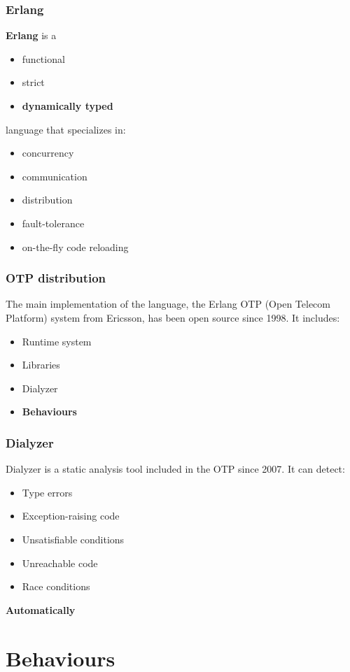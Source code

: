 \documentclass{beamer}
\begin{document}
\begin{frame}
  \frametitle{Erlang} \textbf{Erlang} is a
  \begin{itemize}
  \item functional
  \item strict
  \item \textbf{dynamically typed}
  \end{itemize}
  language that specializes in:
  \begin{itemize}
  \item concurrency
  \item communication
  \item distribution
  \item fault-tolerance
  \item on-the-fly code reloading
  \end{itemize}
\end{frame}

\begin{frame}
  \frametitle{OTP distribution} The main implementation of the
  language, the Erlang OTP (Open Telecom Platform) system from
  Ericsson, has been open source since 1998.  \pause It includes:
  \begin{itemize}
  \item Runtime system
  \item Libraries
  \item Dialyzer
  \item \textbf{Behaviours}
  \end{itemize}
\end{frame}

\begin{frame}
  \frametitle{Dialyzer} Dialyzer is a static analysis tool included in
  the OTP since 2007. \pause It can detect:
  \begin{itemize}
  \item Type errors
  \item Exception-raising code
  \item Unsatisfiable conditions
  \item Unreachable code
  \item Race conditions
  \end{itemize}
  \pause
  \begin{center}
    \textbf{Automatically}
  \end{center}
\end{frame}

\section{Behaviours}
\end{document}

